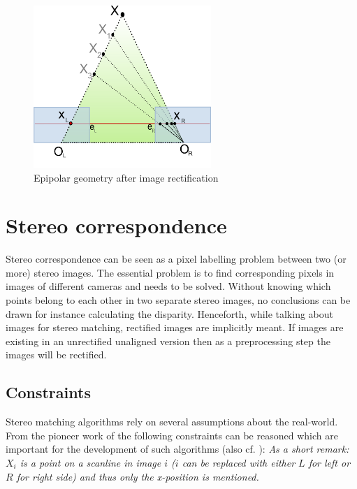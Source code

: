 \begin{figure}[h!]
  \centering
  \includegraphics[width=0.6\textwidth]{src/images/epipolar-rectified.png}
  \caption[Epipolar geometry after image rectification]{Epipolar geometry after image rectification\protect\footnotemark}
  \label{fig:epipolar-rectified}
\end{figure}

\newpage

\section{Stereo correspondence}

Stereo correspondence can be seen as a pixel labelling problem \citep{wanner2013reconstructing, cyganek2011introduction} between two (or more) stereo images.
The essential problem is to find corresponding pixels in images of different cameras and needs to be solved.
Without knowing which points belong to each other in two separate stereo images, no conclusions can be drawn for instance calculating the disparity.
Henceforth, while talking about images for stereo matching, rectified images are implicitly meant.
If images are existing in an unrectified unaligned version then as a preprocessing step the images will be rectified.

\subsection*{Constraints}

Stereo matching algorithms rely on several assumptions about the real-world.
From the pioneer work of \citeauthor{marr1976cooperative} \citep{marr1976cooperative} the following constraints can be reasoned which are important for the development of such algorithms (also cf. \citep{cyganek2011introduction, wanner2013reconstructing,kack2004robust}):
\newline\newline\noindent \textit{As a short remark: $X_i$ is a point on a scanline in image $i$ ($i$ can be replaced with either $L$ for left or $R$ for right side) and thus only the x-position is mentioned.}

